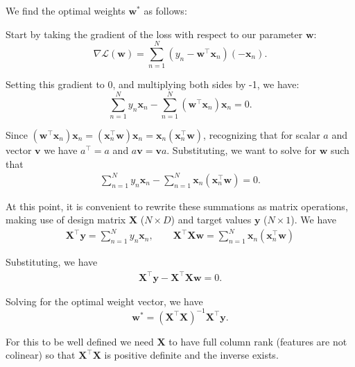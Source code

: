 \begin{derivation}
    We find the optimal weights $\mathbf{w}^*$ as follows:

    Start by taking the gradient of the loss with respect to our parameter $\mathbf{w}$: $$\nabla \mathcal{L}(\mathbf{w}) = \sum_{n=1}^{N} (y_n - \mathbf{w}^\top \mathbf{x}_n)(-\mathbf{x}_n).$$

    Setting this gradient to 0, and multiplying both sides by -1, we have:
    \begin{equation}
      \label{least-squares-solving-for-w}
      \sum_{n=1}^{N} y_n \mathbf{x}_n - \sum_{n=1}^N (\mathbf{w}^\top\mathbf{x}_n)\mathbf{x}_n=0.
    \end{equation}

    Since $(\mathbf{w}^\top\mathbf{x}_n)\mathbf{x}_n=(\mathbf{x}_n^\top\mathbf{w})\mathbf{x}_n=\mathbf{x}_n(\mathbf{x}_n^\top\mathbf{w})$,  recognizing that for scalar $a$ and vector $\mathbf{v}$ we have $a^\top=a$ and $a\mathbf{v}=\mathbf{v}a$. 
    Substituting, we want to solve for $\mathbf{w}$ such that
    \begin{align*}
    \sum_{n=1}^{N} y_n \mathbf{x}_n - \sum_{n=1}^N \mathbf{x}_n(\mathbf{x}_n^\top\mathbf{w}) =0.
    \end{align*}

    At this point, it is convenient to rewrite these summations as matrix operations, making use of design matrix $\mathbf{X}$ ($N\times D$) and target values $\mathbf{y}$ ($N\times 1$).
    We have
    \begin{align*}
    \mathbf{X}^\top\mathbf{y}=\sum_{n=1}^N y_n \mathbf{x}_n, \quad\quad
    \mathbf{X}^\top\mathbf{X}\mathbf{w}=\sum_{n=1}^N\mathbf{x}_n(\mathbf{x}_n^\top\mathbf{w})
    \end{align*}

    Substituting, we have 
        \begin{align*}
            \mathbf{X}^\top\mathbf{y} - \mathbf{X}^\top\mathbf{X}\mathbf{w} = 0.
        \end{align*}

        Solving for the optimal weight vector, we have 
        \begin{equation}
            \label{eq:least-squares-solved-for-w}
            \mathbf{w}^* = (\mathbf{X}^\top \mathbf{X})^{-1} \mathbf{X}^\top \mathbf{y}.
        \end{equation}

    For this to be well defined we need $\mathbf{X}$ to have full column rank (features are not colinear) so that $\mathbf{X}^\top \mathbf{X}$ is positive definite and the inverse exists.
\end{derivation}

